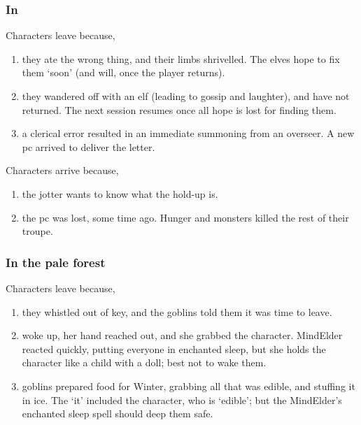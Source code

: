 \begin{multicols}{2}
{  \subsubsection{In }

  Characters leave because,

  \begin{enumerate}
    \item
    they ate the wrong thing, and their limbs shrivelled.
    The elves hope to fix them `soon' (and will, once the player returns).
    \item
    they wandered off with an elf (leading to gossip and laughter), and have not returned.
    The next session resumes once all hope is lost for finding them.
    \item
    a clerical error resulted in an immediate summoning from an overseer.
    A new \gls{pc} arrived to deliver the letter.
  \end{enumerate}

  Characters arrive because,

  \begin{enumerate}
    \item
    the \gls{jotter} wants to know what the hold-up is.
    \item
    the \gls{pc} was lost, some time ago.
    Hunger and monsters killed the rest of their troupe.
  \end{enumerate}

  \subsubsection{In the pale forest}

  Characters leave because,

  \begin{enumerate}
    \item
    they whistled out of key, and the goblins told them it was time to leave.
    \item
     woke up, her hand reached out, and she grabbed the character.
    \gls{MindElder} reacted quickly, putting everyone in enchanted sleep, but she holds the character like a child with a doll; best not to wake them.
    \item
    goblins prepared food for Winter, grabbing all that was edible, and stuffing it in ice.
    The `it' included the character, who is `edible'; but the \gls{MindElder}'s enchanted sleep spell should deep them safe.
  \end{enumerate}

}
\end{multicols}
